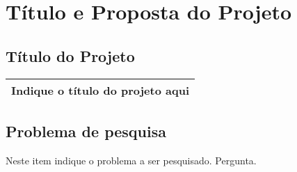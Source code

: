 \documentclass[article,12pt, a4paper]{abntex2}
\begin{document}
	
%			

\imprimircapa
\textual

\section{Título e Proposta do Projeto}

\subsection{Título do Projeto}
\begin{tabular}{|m{15cm}|}
			\hline
			\textbf{Indique o título do projeto aqui} \\
			\hline
		\end{tabular}


\subsection{Problema de pesquisa}
Neste item indique o problema a ser pesquisado. Pergunta.
\end{document}
